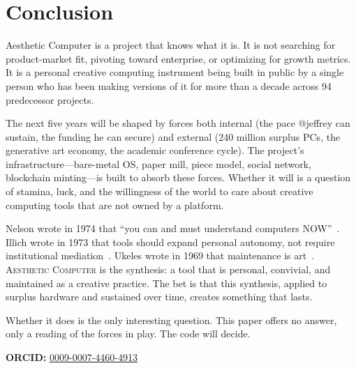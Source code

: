 \documentclass[10pt,letterpaper,twocolumn]{article}
\newcommand{\ac}{\textsc{Aesthetic Computer}}
\begin{document}

\section{Conclusion}

Aesthetic Computer is a project that knows what it is. It is not searching for product-market fit, pivoting toward enterprise, or optimizing for growth metrics. It is a personal creative computing instrument being built in public by a single person who has been making versions of it for more than a decade across 94 predecessor projects.

The next five years will be shaped by forces both internal (the pace @jeffrey can sustain, the funding he can secure) and external (240 million surplus PCs, the generative art economy, the academic conference cycle). The project's infrastructure---bare-metal OS, paper mill, piece model, social network, blockchain minting---is built to absorb these forces. Whether it will is a question of stamina, luck, and the willingness of the world to care about creative computing tools that are not owned by a platform.

Nelson wrote in 1974 that ``you can and must understand computers NOW''~\citep{nelson1974computerlib}. Illich wrote in 1973 that tools should expand personal autonomy, not require institutional mediation~\citep{illich1973tools}. Ukeles wrote in 1969 that maintenance is art~\citep{ukeles1969manifesto}. \ac{} is the synthesis: a tool that is personal, convivial, and maintained as a creative practice. The bet is that this synthesis, applied to surplus hardware and sustained over time, creates something that lasts.

Whether it does is the only interesting question. This paper offers no answer, only a reading of the forces in play. The code will decide.

\vspace{0.5em}
\noindent\textbf{ORCID:} \href{https://orcid.org/0009-0007-4460-4913}{0009-0007-4460-4913}




\end{document}
